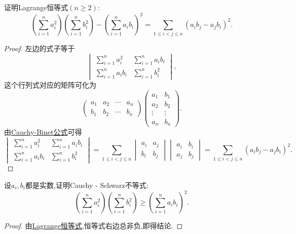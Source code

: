 \documentclass[../../main.tex]{subfiles}%
\begin{document}
\begin{lemma}[Lagrange恒等式]\label{lemma:Lagrange恒等式}
证明Lagrange恒等式\((n\geqslant 2)\):
\[
\left(\sum_{i = 1}^{n}a_i^2\right)\left(\sum_{i = 1}^{n}b_i^2\right)-\left(\sum_{i = 1}^{n}a_ib_i\right)^2=\sum_{1\leqslant  i<j\leqslant  n}(a_ib_j - a_jb_i)^2.
\]
\end{lemma}
\begin{proof}
左边的式子等于
\[
\begin{vmatrix}
\sum_{i = 1}^{n}a_i^2 & \sum_{i = 1}^{n}a_ib_i\\
\sum_{i = 1}^{n}a_ib_i & \sum_{i = 1}^{n}b_i^2
\end{vmatrix},
\]
这个行列式对应的矩阵可化为
\[
\begin{pmatrix}
a_1 & a_2 & \cdots & a_n\\
b_1 & b_2 & \cdots & b_n
\end{pmatrix}
\begin{pmatrix}
a_1 & b_1\\
a_2 & b_2\\
\vdots & \vdots\\
a_n & b_n
\end{pmatrix}.
\]
由\hyperref[theorem:Cauchy-Binet公式]{Cauchy-Binet公式}可得
\[
\begin{vmatrix}
\sum\limits_{i = 1}^{n}a_i^2 & \sum\limits_{i = 1}^{n}a_ib_i\\
\sum\limits_{i = 1}^{n}a_ib_i & \sum\limits_{i = 1}^{n}b_i^2
\end{vmatrix}
=\sum_{1\leqslant  i<j\leqslant  n}
\begin{vmatrix}
a_i & a_j\\
b_i & b_j
\end{vmatrix}
\begin{vmatrix}
a_i & b_i\\
a_j & b_j
\end{vmatrix}
=\sum_{1\leqslant  i<j\leqslant  n}(a_ib_j - a_jb_i)^2.
\]  
\end{proof}

\begin{theorem}\label{theorem:Cauchy - Schwarz不等式}
设\(a_i,b_i\)都是实数,证明Cauchy - Schwarz不等式:
\[
\left(\sum_{i = 1}^{n}a_i^2\right)\left(\sum_{i = 1}^{n}b_i^2\right)\geqslant \left(\sum_{i = 1}^{n}a_ib_i\right)^2.
\]
\end{theorem}
\begin{proof}
由\hyperref[lemma:Lagrange恒等式]{Lagrange恒等式},恒等式右边总非负,即得结论.
\end{proof}
\end{document}
